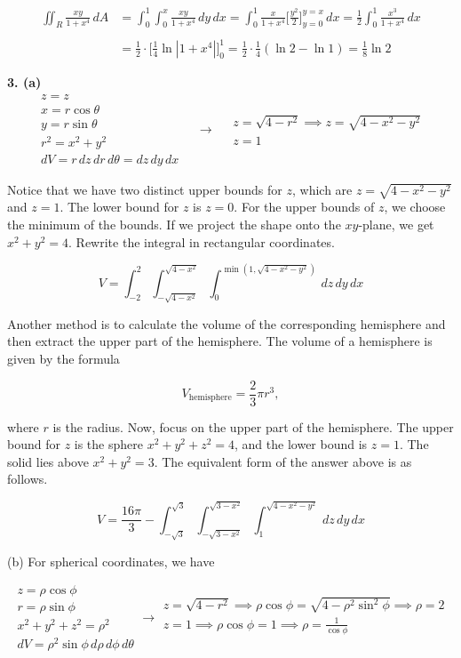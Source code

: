 \documentclass{article}
\begin{document}
\begin{align*}\iint_R\frac{xy}{1+x^4}\,dA&=\int_0^1\int_0^x\frac{xy}{1+x^4}\,dy\,dx=\int_0^1\frac x{1+x^4}\bigg[\frac{y^2}2\bigg]_{y=0}^{y=x}\,dx=\frac12\int_0^1\frac{x^3}{1+x^4}\,dx\\\\&=\frac12\cdot\bigg[\frac14\ln\left|1+x^4\right|\bigg]_0^1=\frac12\cdot\frac14\left(\ln2-\ln1\right)=\boxed{\frac18\ln2}\end{align*}

\vspace{1em}

\textbf{3. (a)}
\[
\begin{array}{c}
z=z\\
x=r\cos\theta\\
y=r\sin\theta\\
r^2=x^2+y^2\\
dV=r\,dz\,dr\,d\theta=dz\,dy\,dx
\end{array}\quad\rightarrow\quad
\begin{array}{c}
z=\sqrt{4-r^2}\implies z=\sqrt{4-x^2-y^2}\\
z=1
\end{array}
\]

Notice that we have two distinct upper bounds for $z$, which are $z=\sqrt{4-x^2-y^2}$ and $z=1$. The lower bound for $z$ is $z=0$. For the upper bounds of $z$, we choose the minimum of the bounds. If we project the shape onto the $xy$-plane, we get $x^2+y^2=4$. Rewrite the integral in rectangular coordinates.

\[\boxed{V=\int_{-2}^2\int_{-\sqrt{4-x^2}}^{\sqrt{4-x^2}}\int_0^{\min\left(1,\sqrt{4-x^2-y^2}\right)}\,dz\,dy\,dx}\]

Another method is to calculate the volume of the corresponding hemisphere and then extract the upper part of the hemisphere. The volume of a hemisphere is given by the formula

\[V_{\text{hemisphere}}=\frac23\pi r^3,\]

where $r$ is the radius. Now, focus on the upper part of the hemisphere. The upper bound for $z$ is the sphere $x^2+y^2+z^2=4$, and the lower bound is $z=1$. The solid lies above $x^2+y^2=3$. The equivalent form of the answer above is as follows.

\[\boxed{V=\frac{16\pi}3-\int_{-\sqrt3}^{\sqrt3}\int_{-\sqrt{3-x^2}}^{\sqrt{3-x^2}}\int_1^{\sqrt{4-x^2-y^2}}\,dz\,dy\,dx}\]

(b) For spherical coordinates, we have

\[
\begin{array}{c}
z=\rho\cos\phi\\
r=\rho\sin\phi\\
x^2+y^2+z^2=\rho^2\\
dV=\rho^2\sin\phi\,d\rho\,d\phi\,d\theta
\end{array}\rightarrow
\begin{array}{c}
z=\sqrt{4-r^2}\implies\rho\cos\phi=\sqrt{4-\rho^2\sin^2\phi}\implies\rho=2\\
\displaystyle z=1\implies\rho\cos\phi=1\implies\rho=\frac1{\cos\phi}\\[1em]
\end{array}
\]
\end{document}
